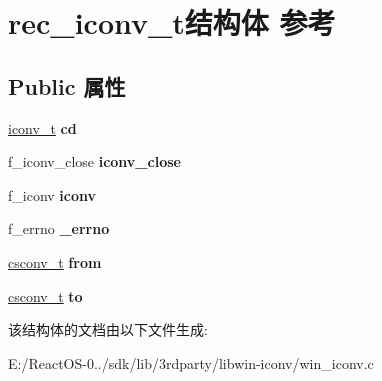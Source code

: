 \hypertarget{structrec__iconv__t}{}\section{rec\+\_\+iconv\+\_\+t结构体 参考}
\label{structrec__iconv__t}
\subsection*{Public 属性}
\begin{DoxyCompactItemize}
\item 
\mbox{\label{structrec__iconv__t_a89819b3548d2b90ff6a80974286c098c}} 
\hyperlink{interfacevoid}{iconv\+\_\+t} {\bfseries cd}
\item 
\mbox{\label{structrec__iconv__t_a4b1c6771d68845c8d882339c701629d7}} 
f\+\_\+iconv\+\_\+close {\bfseries iconv\+\_\+close}
\item 
\mbox{\label{structrec__iconv__t_abaef7f961fe1f4737cd4f32ce8a15c79}} 
f\+\_\+iconv {\bfseries iconv}
\item 
\mbox{\label{structrec__iconv__t_a8b64708e19f62ad60e00b4fb7031207a}} 
f\+\_\+errno {\bfseries \+\_\+errno}
\item 
\mbox{\label{structrec__iconv__t_a00c99513a9d6091783297d37b88892f8}} 
\hyperlink{structcsconv__t}{csconv\+\_\+t} {\bfseries from}
\item 
\mbox{\label{structrec__iconv__t_ab239c0705dd676d3fbc416f54e2f5270}} 
\hyperlink{structcsconv__t}{csconv\+\_\+t} {\bfseries to}
\end{DoxyCompactItemize}


该结构体的文档由以下文件生成\+:\begin{DoxyCompactItemize}
\item 
E\+:/\+React\+O\+S-\/0../sdk/lib/3rdparty/libwin-\/iconv/win\+\_\+iconv.\+c\end{DoxyCompactItemize}
